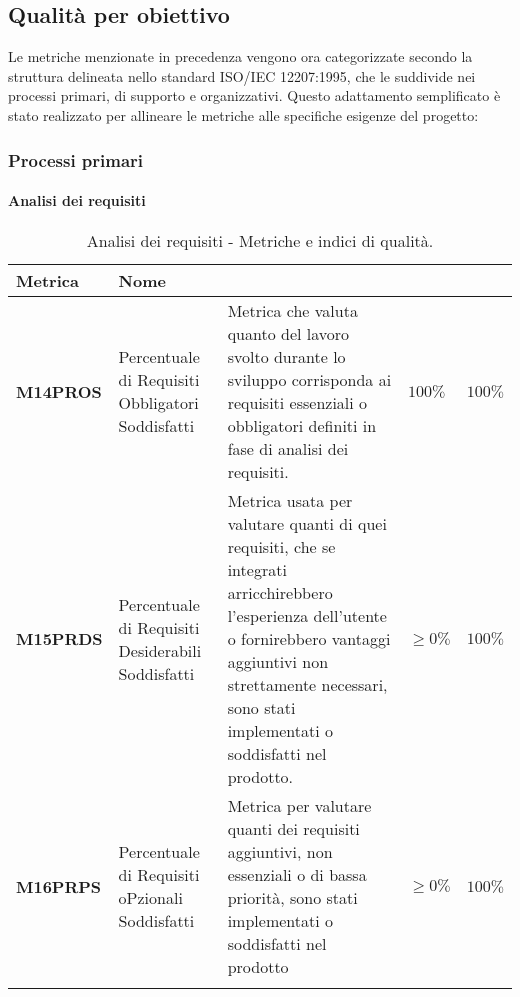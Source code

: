 \subsection{Qualità per obiettivo}
Le metriche menzionate in precedenza vengono ora categorizzate secondo la struttura delineata nello standard ISO/IEC 12207:1995, che le suddivide nei processi primari, di supporto e organizzativi. Questo adattamento semplificato è stato realizzato per allineare le metriche alle specifiche esigenze del progetto:

\subsubsection{Processi primari}
\paragraph{Analisi dei requisiti}
\hspace{1pt}
    \begin{longtable}{|C{1.5cm}|L{3cm}|L{4cm}|L{2.5cm}|L{2.5cm}|}
        \hline
        \textbf{Metrica} & \textbf{Nome} & \textbf{} & \textbf{} & \textbf{} \\
        \hline\textbf{M14PROS} & Percentuale di Requisiti Obbligatori Soddisfatti &  Metrica che valuta quanto del lavoro svolto durante lo sviluppo corrisponda ai requisiti essenziali o obbligatori definiti in fase di analisi dei requisiti.  & $ 100\%$  & $ 100\%$ \\
        \hline
        \textbf{M15PRDS} & Percentuale di Requisiti Desiderabili Soddisfatti & Metrica usata per valutare quanti di quei requisiti, che se integrati arricchirebbero l'esperienza dell'utente o fornirebbero vantaggi aggiuntivi non strettamente necessari, sono stati implementati o soddisfatti nel prodotto. & $\geq 0\%$ & $100\%$ \\
        \hline
        \textbf{M16PRPS} & Percentuale di Requisiti oPzionali Soddisfatti & Metrica per valutare quanti dei requisiti aggiuntivi, non essenziali o di bassa priorità, sono stati implementati o soddisfatti nel prodotto & $\geq 0\%$ & $100\%$ \\
        \hline
    \caption{Analisi dei requisiti - Metriche e indici di qualità.}
    \label{tab:analisi_requisiti_progetto}
\end{longtable}

